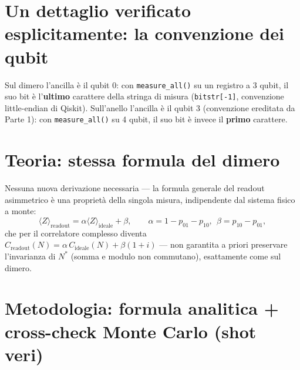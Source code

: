 \documentclass[11pt,a4paper]{article}
\begin{document}
\section{Un dettaglio verificato esplicitamente: la convenzione dei qubit}

Sul dimero l'ancilla è il qubit 0: con \texttt{measure\_all()} su un registro a 3 qubit, il suo
bit è l'\textbf{ultimo} carattere della stringa di misura (\texttt{bitstr[-1]}, convenzione
little-endian di Qiskit). Sull'anello l'ancilla è il qubit 3 (convenzione ereditata da Parte 1):
con \texttt{measure\_all()} su 4 qubit, il suo bit è invece il \textbf{primo} carattere.


\section{Teoria: stessa formula del dimero}

Nessuna nuova derivazione necessaria --- la formula generale del readout asimmetrico è una
proprietà della singola misura, indipendente dal sistema fisico a monte:
$$\langle Z\rangle_\text{readout} = \alpha\langle Z\rangle_\text{ideale} + \beta,
\qquad \alpha = 1-p_{01}-p_{10},\ \ \beta = p_{10}-p_{01},$$
che per il correlatore complesso diventa $C_\text{readout}(N) = \alpha\,C_\text{ideale}(N) +
\beta(1+i)$ --- non garantita a priori preservare l'invarianza di $N^*$ (somma e modulo non
commutano), esattamente come sul dimero.

\section{Metodologia: formula analitica + cross-check Monte Carlo (shot veri)}
\end{document}
